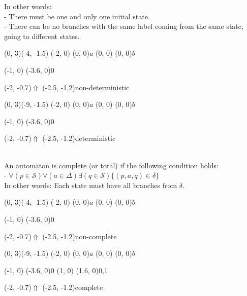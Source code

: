 \documentclass{article}
\begin{document}
In other words:\\
- There must be one and only one initial state.\\
- There can be no branches with the same label coming from the same state,
  going to different states.\\
\begin{graph}(0, 3)(-4, -1.5)
  (-2, 0) (0, 0){$a$}
  (0, 0) (0, 0){$b$}

  (-1, 0) \freetext(-3.6, 0){0}
   

  \freetext(-2, -0.7){$\Uparrow$}
  \freetext(-2.5, -1.2){non-deterministic}
\end{graph}
\begin{graph}(0, 3)(-9, -1.5)
  (-2, 0) (0, 0){$a$}
  (0, 0) (0, 0){$b$}

  (-1, 0) \freetext(-3.6, 0){0}
   

  \freetext(-2, -0.7){$\Uparrow$}
  \freetext(-2.5, -1.2){deterministic}
\end{graph}
\\
An automaton is complete (or total) if the following condition holds:\\
- $\forall (p \in \mathcal{S}) \forall (a \in \Delta)
\exists (q \in \mathcal{S}) \{(p, a, q) \in \delta\}$\\
In other words: Each state must have all branches from $\delta$.\\
\begin{graph}(0, 3)(-4, -1.5)
  (-2, 0) (0, 0){$a$}
  (0, 0) (0, 0){$b$}

  (-1, 0) \freetext(-3.6, 0){0}
   

  \freetext(-2, -0.7){$\Uparrow$}
  \freetext(-2.5, -1.2){non-complete}
\end{graph}
\begin{graph}(0, 3)(-9, -1.5)
  (-2, 0) (0, 0){$a$}
  (0, 0) (0, 0){$b$}

  (-1, 0) \freetext(-3.6, 0){0}
  (1, 0) \freetext(1.6, 0){0,1}
   

  \freetext(-2, -0.7){$\Uparrow$}
  \freetext(-2.5, -1.2){complete}
\end{graph}
\end{document}

